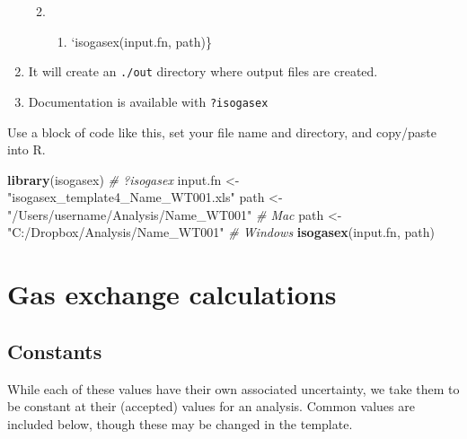 \documentclass[]{article}
\newenvironment{Shaded}{\begin{snugshade}}{\end{snugshade}}
\newcommand{\CommentTok}[1]{\textcolor[rgb]{0.56,0.35,0.01}{\textit{#1}}}
\newcommand{\KeywordTok}[1]{\textcolor[rgb]{0.13,0.29,0.53}{\textbf{#1}}}
\newcommand{\NormalTok}[1]{#1}
\newcommand{\StringTok}[1]{\textcolor[rgb]{0.31,0.60,0.02}{#1}}
\providecommand{\tightlist}{%
  \setlength{\itemsep}{0pt}\setlength{\parskip}{0pt}}
\begin{document}
\begin{enumerate}
  \begin{enumerate}
  \def\labelenumii{\arabic{enumii}.}
  \item
    \begin{enumerate}
    \def\labelenumiii{\alph{enumiii}.}
    \tightlist
    \item
      `isogasex(input.fn, path)\}
    \end{enumerate}
  \end{enumerate}
\item
  It will create an \texttt{./out} directory where output files are
  created.
\item
  Documentation is available with \texttt{?isogasex}
\end{enumerate}

Use a block of code like this, set your file name and directory, and
copy/paste into R.

\begin{Shaded}
\begin{Highlighting}[]
\KeywordTok{library}\NormalTok{(isogasex)}
\CommentTok{# ?isogasex}
\NormalTok{input.fn <-}\StringTok{ "isogasex_template4_Name_WT001.xls"}
\NormalTok{path <-}\StringTok{ "/Users/username/Analysis/Name_WT001"} \CommentTok{# Mac}
\NormalTok{path <-}\StringTok{ "C:/Dropbox/Analysis/Name_WT001"}      \CommentTok{# Windows}
\KeywordTok{isogasex}\NormalTok{(input.fn, path)}
\end{Highlighting}
\end{Shaded}

\hypertarget{gas-exchange-calculations}{%
\section{Gas exchange calculations}\label{gas-exchange-calculations}}

\hypertarget{constants}{%
\subsection{Constants}\label{constants}}

While each of these values have their own associated uncertainty, we
take them to be constant at their (accepted) values for an analysis.
Common values are included below, though these may be changed in the
template.
\end{document}
